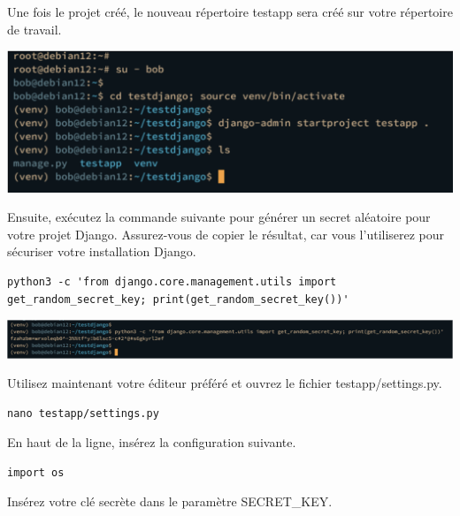 \documentclass{article}
\begin{document}
Une fois le projet créé, le nouveau répertoire testapp sera créé sur votre répertoire de travail.

\begin{center}
\includegraphics[width=15cm]{images/image11.png}
\end{center}

Ensuite, exécutez la commande suivante pour générer un secret aléatoire pour votre projet Django. Assurez-vous de copier le résultat, car vous l'utiliserez pour sécuriser votre installation Django.

\begin{verbatim}
python3 -c 'from django.core.management.utils import get_random_secret_key; print(get_random_secret_key())'
\end{verbatim}

\begin{center}
\includegraphics[width=15cm]{images/image12.png}
\end{center}

Utilisez maintenant votre éditeur préféré et ouvrez le fichier testapp/settings.py.

\begin{verbatim}
nano testapp/settings.py
\end{verbatim}

En haut de la ligne, insérez la configuration suivante.

\begin{verbatim}
import os
\end{verbatim}

Insérez votre clé secrète dans le paramètre SECRET\_KEY.
\end{document}
